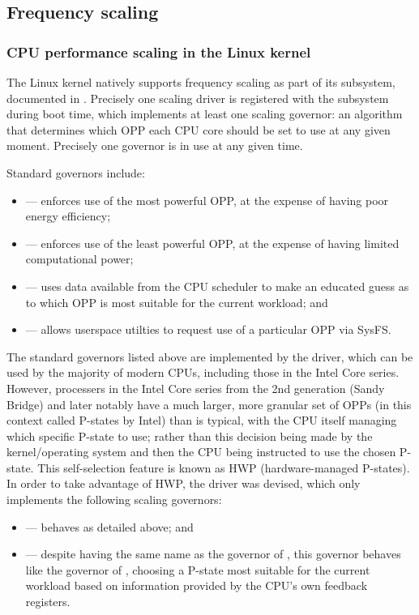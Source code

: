 \subsection{Frequency scaling}

\subsubsection{CPU performance scaling in the Linux kernel}

The Linux kernel natively supports frequency scaling as part of its 
subsystem, documented in \cite{linuxCPUScaling}. Precisely one scaling driver is
registered with the subsystem during boot time, which implements at least one
scaling governor: an algorithm that determines which OPP each CPU core should be
set to use at any given moment. Precisely one governor is in use at any given time.

Standard governors include:
\begin{itemize}
    \item {} — enforces use of the most powerful OPP, at the expense
        of having poor energy efficiency;
    \item {} — enforces use of the least powerful OPP, at the expense of
        having limited computational power;
    \item {} — uses data available from the CPU scheduler to make an
        educated guess as to which OPP is most suitable for the current
        workload; and
    \item {} — allows userspace utilties to request use of a
        particular OPP via SysFS.
\end{itemize}

The standard governors listed above are implemented by the 
driver, which can be used by the majority of modern CPUs, including those in
the Intel Core series. However, processers in the Intel Core series from the
2nd generation (Sandy Bridge) and later notably have a much larger, more
granular set of OPPs (in this context called P-states by Intel) than is
typical,\cite{intelDevManual} with the CPU itself managing which specific
P-state to use; rather than this decision being made by the kernel/operating
system and then the CPU being instructed to use the chosen P-state.
This self-selection feature is known as HWP (hardware-managed P-states).
In order to take advantage of HWP, the  driver was
devised,\cite{linuxIntelPState} which only implements the following scaling
governors:
\begin{itemize}
    \item {} — behaves as detailed above; and
    \item {} — despite having the same name as the
         governor of , this governor behaves
        like the  governor of , choosing a
        P-state most suitable for the current workload based on information
        provided by the CPU's own feedback registers.
\end{itemize}

